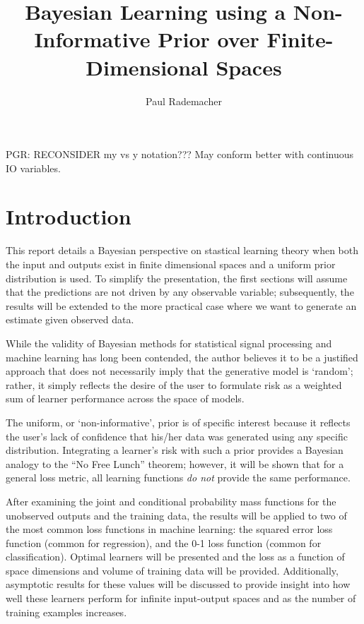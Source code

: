 \documentclass[12pt]{article}
\title{Bayesian Learning using a Non-Informative Prior over Finite-Dimensional Spaces}
\author{Paul Rademacher}
\begin{document}
\maketitle

PGR: RECONSIDER my vs y notation??? May conform better with continuous IO variables.

\section{Introduction}


This report details a Bayesian perspective on stastical learning theory when both the input and outputs exist in finite dimensional spaces and a uniform prior distribution is used. To simplify the presentation, the first sections will assume that the predictions are not driven by any observable variable; subsequently, the results will be extended to the more practical case where we want to generate an estimate given observed data.

While the validity of Bayesian methods for statistical signal processing and machine learning has long been contended, the author believes it to be a justified approach that does not necessarily imply that the generative model is `random'; rather, it simply reflects the desire of the user to formulate risk as a weighted sum of learner performance across the space of models. 

The uniform, or `non-informative', prior is of specific interest because it reflects the user's lack of confidence that his/her data was generated using any specific distribution. Integrating a learner's risk with such a prior provides a Bayesian analogy to the ``No Free Lunch'' theorem; however, it will be shown that for a general loss metric, all learning functions \emph{do not} provide the same performance.

After examining the joint and conditional probability mass functions for the unobserved outputs and the training data, the results will be applied to two of the most common loss functions in machine learning: the squared error loss function (common for regression), and the 0-1 loss function (common for classification). Optimal learners will be presented and the loss as a function of space dimensions and volume of training data will be provided. Additionally, asymptotic results for these values will be discussed to provide insight into how well these learners perform for infinite input-output spaces and as the number of training examples increases. 
\end{document}

